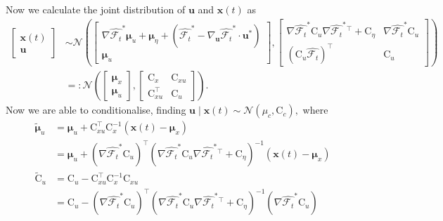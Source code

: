 \documentclass{article}
\newcommand{\vv}[1]{\boldsymbol{#1}}
\newcommand{\mm}[1]{\mathrm{#1}}
\newcommand{\dist}[1]{\mathcal{#1}}
\newcommand{\gvn}{\mid}
\begin{document}
Now we calculate the joint distribution of \(\vv{u}\) and \(\vv{x}(t)\) as
\begin{align}
    \begin{bmatrix}
      \vv{x}(t) \\ \vv{u}
    \end{bmatrix}
  &\sim\dist{N}\left(\begin{bmatrix}
   \nabla \widehat{\mathcal{F}_{t}}^*\vv{\mu}_u +\vv{\mu}_{\eta}
  +\left(\widehat{\mathcal{F}_{t}}^* -\nabla_{\vv{u}} \widehat{\mathcal{F}_{t}}^*\cdot \vv{u}^*\right)\\ \vv{\mu}_u
\end{bmatrix}, 
\begin{bmatrix}
  \nabla \widehat{\mathcal{F}_{t}}^* \mm{C}_u\nabla \widehat{\mathcal{F}_{t}}^*{}^\top +\mm{C}_{\eta} & \nabla \widehat{\mathcal{F}_{t}}^* \mm{C}_u\\
  \left(\mm{C}_{u}\widehat{\mathcal{F}_{t}}\right)^\top & \mm{C}_{u}
\end{bmatrix}
\right)\\
&=:\dist{N}\left(\begin{bmatrix}
   \vv{\mu}_x\\
   \vv{\mu}_u
\end{bmatrix}, 
\begin{bmatrix}
  \mm{C}_{x} & \mm{C}_{xu} \\
  \mm{C}_{xu}^\top & \mm{C}_{u}
\end{bmatrix}\right).
\end{align}
Now we are able to conditionalise, finding \(\vv{u}\gvn \vv{x}(t)\sim\dist{N}(\mu_c,\mm{C}_c),\)
where
\begin{align}
\tilde{\boldsymbol{\mu}}_{u}
&=\boldsymbol{\mu}_{u}+\mm{C}_{xu}^{\top} \mm{C}_{x}^{-1}\left(\vv{x}(t)-\boldsymbol{\mu}_{x}\right) \\
&=\vv{\mu}_u + \left(\nabla \widehat{\mathcal{F}_{t}}^* \mm{C}_u \right)^\top\left(\nabla \widehat{\mathcal{F}_{t}}^* \mm{C}_u\nabla \widehat{\mathcal{F}_{t}}^*{}^\top +\mm{C}_{\eta} \right)^{-1} \left(\vv{x}(t)-\vv{\mu}_x\right)\label{eq:linearizedpostmean}\\
\tilde{\mm{C}}_{u}
&=\mm{C}_{u}-\mm{C}_{xu}^{\top} \mm{C}_{x}^{-1} \mm{C}_{xu}\\
&=\mm{C}_{u} - \left(\nabla \widehat{\mathcal{F}_{t}}^* \mm{C}_u \right)^\top\left(\nabla \widehat{\mathcal{F}_{t}}^* \mm{C}_u\nabla \widehat{\mathcal{F}_{t}}^*{}^\top +\mm{C}_{\eta} \right)^{-1}\left(\nabla \widehat{\mathcal{F}_{t}}^* \mm{C}_u \right)\label{eq:linearizedpostvar}
\end{align}
\end{document}
